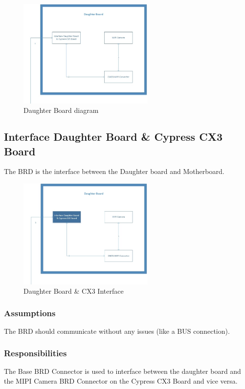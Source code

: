 
\begin{figure}[h!]
	\centering
 	\includegraphics[width=0.60\textwidth]{images/DaughterBoard}
 \caption{Daughter Board diagram}
\end{figure}


\subsection{Interface Daughter Board & Cypress CX3 Board}
The BRD is the interface between the Daughter board and Motherboard.

\begin{figure}[h!]
	\centering
 	\includegraphics[width=0.60\textwidth]{images/DaughterBoard_Interface}
 \caption{Daughter Board & CX3 Interface}
\end{figure}

\subsubsection{Assumptions}
The BRD should communicate without any issues (like a BUS connection).

\subsubsection{Responsibilities}
The Base BRD Connector is used to interface between the daughter board and the MIPI Camera BRD Connector on the Cypress CX3 Board and vice versa.

